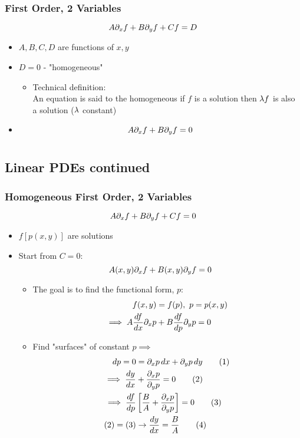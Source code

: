 \documentclass[Maths.tex]{subfiles}
\begin{document}
\subsection{First Order, 2 Variables}
\begin{equation}
	A\partial_xf + B\partial_yf + Cf = D
\end{equation}
\begin{itemize}
	\item $A,B,C,D$ are functions of $x,y$
	\item $D = 0$ - "homogeneous"
	\begin{itemize}
		\item Technical definition: \\
		An equation is said to the homogeneous if $f$ is a solution then $\lambda f$ is also a solution ($\lambda$ constant)
	\end{itemize}
	\item
	\begin{equation}
		A\partial_xf + B\partial_yf = 0
	\end{equation}
\end{itemize}

\chapter{}
\section{Linear PDEs continued}
\subsection{Homogeneous First Order, 2 Variables}
\begin{equation}
	A\partial_xf + B\partial_yf + Cf = 0
\end{equation}
\begin{itemize}
	\item $f[p(x,y)]$ are solutions
	\item Start from $C=0$:
	\begin{equation}
		A(x,y)\partial_xf + B(x,y)\partial_yf = 0
	\end{equation}
	\begin{itemize}
		\item The goal is to find the functional form, $p$:
		\begin{align}
			f(x,y) &= f(p),~ p = p(x,y) \\
			\implies A\frac{df}{dx}\partial_xp &+ B\frac{df}{dp}\partial_yp = 0
		\end{align}
		\item Find "surfaces" of constant $p \implies$
		\begin{align}
			dp = 0 &= \partial_xp\,dx + \partial_yp\,dy \tag{1} \\
			\implies \frac{dy}{dx} &+ \frac{\partial_xp}{\partial_yp} = 0 \tag{2} \\
			\implies \frac{df}{dp}&\left[\frac{B}{A} + \frac{\partial_xp}{\partial_yp}\right] = 0 \tag{3} \\
			(2) = (3) &\to \frac{dy}{dx} = \frac{B}{A} \tag{4}
		\end{align}
	\end{itemize}
\end{itemize}
\end{document}
